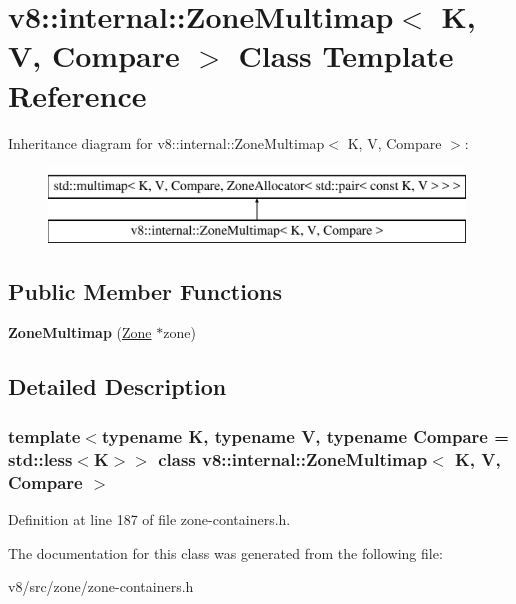 \hypertarget{classv8_1_1internal_1_1ZoneMultimap}{}\section{v8\+:\+:internal\+:\+:Zone\+Multimap$<$ K, V, Compare $>$ Class Template Reference}
\label{classv8_1_1internal_1_1ZoneMultimap}
Inheritance diagram for v8\+:\+:internal\+:\+:Zone\+Multimap$<$ K, V, Compare $>$\+:\begin{figure}[H]
\begin{center}
\leavevmode
\includegraphics[height=2.000000cm]{classv8_1_1internal_1_1ZoneMultimap}
\end{center}
\end{figure}
\subsection*{Public Member Functions}
\begin{DoxyCompactItemize}
\item 
\mbox{\label{classv8_1_1internal_1_1ZoneMultimap_ae7c8e9f76193944fff2dd9e3825fe50c}} 
{\bfseries Zone\+Multimap} (\mbox{\hyperlink{classv8_1_1internal_1_1Zone}{Zone}} $\ast$zone)
\end{DoxyCompactItemize}


\subsection{Detailed Description}
\subsubsection*{template$<$typename K, typename V, typename Compare = std\+::less$<$\+K$>$$>$\newline
class v8\+::internal\+::\+Zone\+Multimap$<$ K, V, Compare $>$}



Definition at line 187 of file zone-\/containers.\+h.



The documentation for this class was generated from the following file\+:\begin{DoxyCompactItemize}
\item 
v8/src/zone/zone-\/containers.\+h\end{DoxyCompactItemize}
